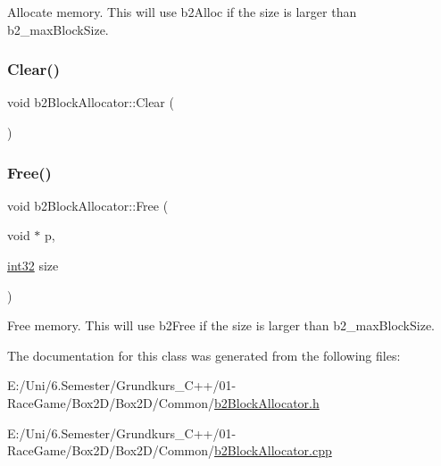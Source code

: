 Allocate memory. This will use b2\+Alloc if the size is larger than b2\+\_\+max\+Block\+Size. 

\mbox{\label{classb2_block_allocator_a3d3bac86217eba9d1eb6dff2acee0d77}} 
\subsubsection{\texorpdfstring{Clear()}{Clear()}}
{\footnotesize\ttfamily void b2\+Block\+Allocator\+::\+Clear (\begin{DoxyParamCaption}{ }\end{DoxyParamCaption})}

\mbox{\label{classb2_block_allocator_a945fdf86e260318b930a53dcc887ca8b}} 
\subsubsection{\texorpdfstring{Free()}{Free()}}
{\footnotesize\ttfamily void b2\+Block\+Allocator\+::\+Free (\begin{DoxyParamCaption}\item[{void $\ast$}]{p,  }\item[{\mbox{\hyperlink{b2_settings_8h_a43d43196463bde49cb067f5c20ab8481}{int32}}}]{size }\end{DoxyParamCaption})}



Free memory. This will use b2\+Free if the size is larger than b2\+\_\+max\+Block\+Size. 



The documentation for this class was generated from the following files\+:\begin{DoxyCompactItemize}
\item 
E\+:/\+Uni/6.\+Semester/\+Grundkurs\+\_\+\+C++/01-\/\+Race\+Game/\+Box2\+D/\+Box2\+D/\+Common/\mbox{\hyperlink{b2_block_allocator_8h}{b2\+Block\+Allocator.\+h}}\item 
E\+:/\+Uni/6.\+Semester/\+Grundkurs\+\_\+\+C++/01-\/\+Race\+Game/\+Box2\+D/\+Box2\+D/\+Common/\mbox{\hyperlink{b2_block_allocator_8cpp}{b2\+Block\+Allocator.\+cpp}}\end{DoxyCompactItemize}
